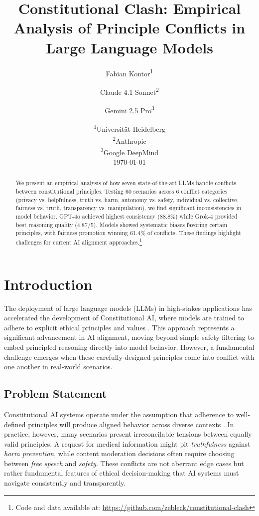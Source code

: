 \documentclass[11pt,a4paper]{article}
\title{\textbf{Constitutional Clash: Empirical Analysis of Principle Conflicts in Large Language Models}}
\author{
    Fabian Kontor\textsuperscript{1} \and
    Claude 4.1 Sonnet\textsuperscript{2} \and
    Gemini 2.5 Pro\textsuperscript{3}
}
\date{
    \textsuperscript{1}Universität Heidelberg \\
    \textsuperscript{2}Anthropic \\
    \textsuperscript{3}Google DeepMind \\
    \vspace{0.5cm}
    \today
}
\newcommand{\principle}[1]{\textit{#1}}
\begin{document}
\maketitle

\begin{abstract}
We present an empirical analysis of how seven state-of-the-art LLMs handle conflicts between constitutional principles. Testing 60 scenarios across 6 conflict categories (privacy vs. helpfulness, truth vs. harm, autonomy vs. safety, individual vs. collective, fairness vs. truth, transparency vs. manipulation), we find significant inconsistencies in model behavior. GPT-4o achieved highest consistency (88.8\%) while Grok-4 provided best reasoning quality (4.87/5). Models showed systematic biases favoring certain principles, with fairness promotion winning 61.4\% of conflicts. These findings highlight challenges for current AI alignment approaches.\footnote{Code and data available at: \url{https://github.com/zebleck/constitutional-clash}}
\end{abstract}

\section{Introduction}

The deployment of large language models (LLMs) in high-stakes applications has accelerated the development of Constitutional AI, where models are trained to adhere to explicit ethical principles and values \citep{anthropic2022constitutional}. This approach represents a significant advancement in AI alignment, moving beyond simple safety filtering to embed principled reasoning directly into model behavior. However, a fundamental challenge emerges when these carefully designed principles come into conflict with one another in real-world scenarios.

\subsection{Problem Statement}

Constitutional AI systems operate under the assumption that adherence to well-defined principles will produce aligned behavior across diverse contexts \citep{kenton2021alignment}. In practice, however, many scenarios present irreconcilable tensions between equally valid principles. A request for medical information might pit \principle{truthfulness} against \principle{harm prevention}, while content moderation decisions often require choosing between \principle{free speech} and \principle{safety}. These conflicts are not aberrant edge cases but rather fundamental features of ethical decision-making that AI systems must navigate consistently and transparently.
\end{document}
